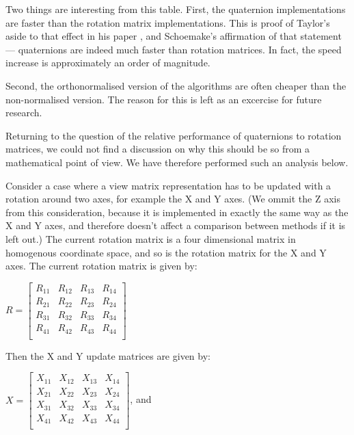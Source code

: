 \documentclass{acm_proc_article-sp}
\begin{document}
Two things are interesting from this table.
First, the quaternion implementations are faster than the rotation matrix implementations.
This is proof of Taylor's aside to that effect in his paper \cite{taylor79}, and Schoemake's affirmation of that statement \cite{schoemake85} --- quaternions are indeed much faster than rotation matrices.
In fact, the speed increase is approximately an order of magnitude.

Second, the orthonormalised version of the algorithms are often cheaper than the non-normalised version.
The reason for this is left as an excercise for future research.

Returning to the question of the relative performance of quaternions to rotation matrices, we could not find a discussion on why this should be so from a mathematical point of view.
We have therefore performed such an analysis below.

Consider a case where a view matrix representation has to be updated with a rotation around two axes, for example the X and Y axes.
(We ommit the Z axis from this consideration, because it is implemented in exactly the same way as the X and Y axes, and therefore doesn't affect a comparison between methods if it is left out.)
The current rotation matrix is a four dimensional matrix in homogenous coordinate space, and so is the rotation matrix for the X and Y axes.
The current rotation matrix is given by:

$R = \left[ \begin{array}{cccc}
    R_{11} & R_{12} & R_{13} & R_{14} \\
    R_{21} & R_{22} & R_{23} & R_{24} \\
    R_{31} & R_{32} & R_{33} & R_{34} \\
    R_{41} & R_{42} & R_{43} & R_{44} \\
\end{array} \right]$

Then the X and Y update matrices are given by:

\vspace{0.5em}
$X = \left[ \begin{array}{cccc}
    X_{11} & X_{12} & X_{13} & X_{14} \\
    X_{21} & X_{22} & X_{23} & X_{24} \\
    X_{31} & X_{32} & X_{33} & X_{34} \\
    X_{41} & X_{42} & X_{43} & X_{44} \\
\end{array} \right]$, and
\end{document}
